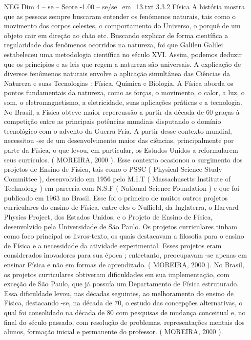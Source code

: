 \begin{textsample}{NEG Dim 4 – se – Score -1.00 – se/se\_em\_13.txt}  \label{ex:f4_neg_143}
3.3.2 Física A história mostra que as pessoas sempre buscaram entender os fenômenos naturais, tais como o movimento dos corpos celestes, o comportamento do Universo, o porquê de um objeto cair em direção ao chão etc.
Buscando explicar de forma científica a regularidade dos fenômenos ocorridos na natureza, foi que Galileu Galilei estabeleceu uma metodologia científica no século XVI.
Assim, podemos deduzir que os princípios e as leis que regem a natureza são universais.
A explicação de diversos fenômenos naturais envolve a aplicação simultânea das Ciências da Natureza e suas Tecnologias : Física, Química e Biologia.
A Física aborda os pontos fundamentais da natureza, como as forças, o movimento, o calor, a luz, o som, o eletromagnetismo, a eletricidade, suas aplicações práticas e a tecnologia.
No Brasil, a Física obteve maior repercussão a partir da década de 60 graças à competição entre as principais potências mundiais disputando o domínio tecnológico com o advento da Guerra Fria.
A partir desse contexto mundial, necessitou -se de um desenvolvimento maior das ciências, principalmente por parte da Física, o que levou, em particular, os Estados Unidos a reformularem seus currículos. ( MOREIRA, 2000 ).
Esse contexto ocasionou o surgimento dos projetos de Ensino de Física, tais como o PSSC ( Physical Science Study Committee ), desenvolvido em 1956 pelo M.I.T ( Massachusetts Institute of Technology ) em parceria com N.S.F ( National Science Foundation ) e que foi publicado em 1963 no Brasil.
Esse foi o primeiro de muitos outros projetos curriculares do ensino de Física, entre eles o Nuffield, da Inglaterra, o Harvard Physics Project, dos Estados Unidos, e o Projeto de Ensino de Física, desenvolvido pela Universidade de São Paulo.
Os projetos curriculares tinham como foco principal os livros-texto, os quais destacavam a filosofia para o ensino de Física e a necessidade da atividade experimental.
Esses projetos eram considerados inovadores para sua época ; entretanto, preocupavam -se apenas em ensinar Física e não em formas de aprendizado. ( MOREIRA, 2000 ).
No Brasil, os projetos curriculares obtiveram dificuldades em sua implementação, com exceção de São Paulo, que já possuía um Departamento de Física estruturado.
Essa dificuldade levou, nas décadas seguintes, ao melhoramento do ensino de Física, destacando -se, na década de 70, o estudo das concepções alternativas, o qual foi consolidado na década de 80 com pesquisas de mudança conceitual e, no final do século passado, com resolução de problemas, representações mentais dos alunos, formação inicial e permanente do professor. ( MOREIRA, 2000 ).

\end{textsample}
